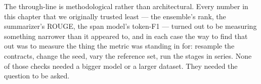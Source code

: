 The through-line is methodological rather than architectural. Every number in this chapter that we originally trusted least --- the ensemble's rank, the summarizer's ROUGE, the span model's token-F1 --- turned out to be measuring something narrower than it appeared to, and in each case the way to find that out was to measure the thing the metric was standing in for: resample the contracts, change the seed, vary the reference set, run the stages in series. None of those checks needed a bigger model or a larger dataset. They needed the question to be asked.
